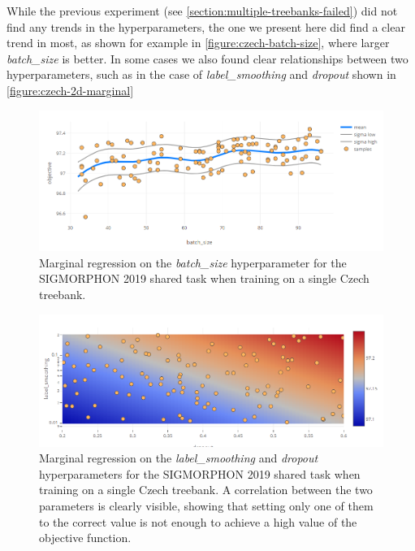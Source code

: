 While the previous experiment (see \autoref{section:multiple-treebanks-failed}) did not find any trends in the hyperparameters, the one we present here did find a clear trend in most, as shown for example in \autoref{figure:czech-batch-size}, where larger \emph{batch\_size} is better. In some cases we also found clear relationships between two hyperparameters, such as in the case of \emph{label\_smoothing} and \emph{dropout} shown in \autoref{figure:czech-2d-marginal}

\begin{figure}
	\begin{center}
		\includegraphics[width=1.0\textwidth]{images/czech-batch-size.png}
		\caption{Marginal regression on the \emph{batch\_size} hyperparameter for the SIGMORPHON 2019 shared task when training on a single Czech treebank.}
		\label{figure:czech-batch-size}
	\end{center}
\end{figure}


\begin{figure}
	\begin{center}
		\includegraphics[width=1.0\textwidth]{images/czech-2d-marginal.png}
		\caption{Marginal regression on the \emph{label\_smoothing} and \emph{dropout} hyperparameters for the SIGMORPHON 2019 shared task when training on a single Czech treebank. A correlation between the two parameters is clearly visible, showing that setting only one of them to the correct value is not enough to achieve a high value of the objective function.}
		\label{figure:czech-2d-marginal}
	\end{center}
\end{figure}


